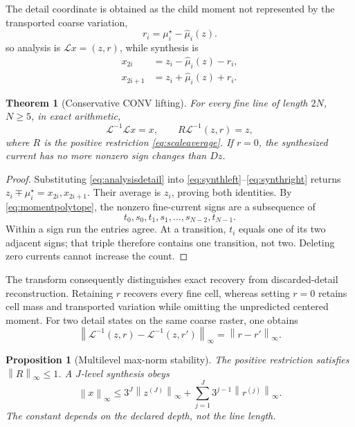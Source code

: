 \documentclass[journal]{IEEEtran}
\newtheorem{theorem}{Theorem}
\newtheorem{proposition}{Proposition}
\newcommand{\norm}[1]{\left\lVert#1\right\rVert}
\begin{document}
The detail coordinate is obtained as the child moment not represented by the
transported coarse variation,
\begin{equation}
 r_i=\mu_i^\star-\widehat\mu_i(z).
 \label{eq:analysisdetail}
\end{equation}
so analysis is \(\mathcal Lx=(z,r)\), while synthesis is
\begin{align}
 x_{2i}&=z_i-\widehat\mu_i(z)-r_i,
 \label{eq:synthleft}\\
 x_{2i+1}&=z_i+\widehat\mu_i(z)+r_i.
 \label{eq:synthright}
\end{align}

\begin{theorem}[Conservative CONV lifting]
For every fine line of length \(2N\), \(N\geq5\), in exact arithmetic,
\begin{equation}
 \mathcal L^{-1}\mathcal Lx=x,
 \qquad R\mathcal L^{-1}(z,r)=z,
 \label{eq:fullcycle}
\end{equation}
where \(R\) is the positive restriction \eqref{eq:scaleaverage}. If \(r=0\),
the synthesized current has no more nonzero sign changes than \(Dz\).
\end{theorem}

\begin{proof}
Substituting \eqref{eq:analysisdetail} into
\eqref{eq:synthleft}--\eqref{eq:synthright} returns
\(z_i\mp\mu_i^\star=x_{2i},x_{2i+1}\). Their average is \(z_i\), proving
both identities. By \eqref{eq:momentpolytope}, the nonzero fine-current signs
are a subsequence of
\[
 t_0,s_0,t_1,s_1,\ldots,s_{N-2},t_{N-1}.
\]
Within a sign run the entries agree. At a transition, \(t_i\) equals one of
its two adjacent signs; that triple therefore contains one transition, not
two. Deleting zero currents cannot increase the count.
\end{proof}

The transform consequently distinguishes exact recovery from
discarded-detail reconstruction. Retaining \(r\) recovers every fine cell,
whereas setting \(r=0\) retains cell mass and transported variation while
omitting the unpredicted centered moment. For two detail states on the same
coarse raster, one obtains
\begin{equation}
 \norm{\mathcal L^{-1}(z,r)-\mathcal L^{-1}(z,r')}_\infty
 =\norm{r-r'}_\infty.
 \label{eq:detailstability}
\end{equation}

\begin{proposition}[Multilevel max-norm stability]
The positive restriction satisfies \(\norm R_\infty\leq1\). A \(J\)-level
synthesis obeys
\begin{equation}
 \norm x_\infty\leq3^J\norm{z^{(J)}}_\infty
 +\sum_{j=1}^{J}3^{j-1}\norm{r^{(j)}}_\infty.
 \label{eq:multilevelstability}
\end{equation}
The constant depends on the declared depth, not the line length.
\end{proposition}
\end{document}
